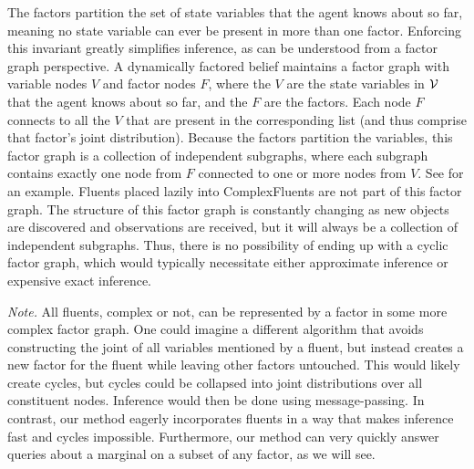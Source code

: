 The factors partition the set of state variables that the agent knows
about so far, meaning no state variable can ever be present in more
than one factor. Enforcing this invariant greatly simplifies
inference, as can be understood from a factor graph perspective. A
dynamically factored belief maintains a factor graph with variable
nodes $V$ and factor nodes $F$, where the $V$ are the state variables
in $\mathcal{V}$ that the agent knows about so far, and the $F$ are the
factors. Each node $F$ connects to all the $V$ that are present in the
corresponding list (and thus comprise that factor's joint
distribution). Because the factors partition the variables, this
factor graph is a collection of independent subgraphs, where each
subgraph contains exactly one node from $F$ connected to one or more
nodes from $V$. See  for an example. Fluents
placed lazily into ComplexFluents are not part of this factor
graph. The structure of this factor graph is constantly changing as
new objects are discovered and observations are received, but it will
always be a collection of independent subgraphs. Thus, there is no
possibility of ending up with a cyclic factor graph, which would
typically necessitate either approximate inference or expensive
exact inference.

\emph{Note.} All fluents, complex or not, can be represented by a
factor in some more complex factor graph. One could imagine a
different algorithm that avoids constructing the joint of all
variables mentioned by a fluent, but instead creates a new factor for the
fluent while leaving other factors untouched. This would likely create
cycles, but cycles could be collapsed into joint distributions over
all constituent nodes. Inference would then be done using
message-passing. In contrast, our method eagerly incorporates fluents
in a way that makes inference fast and cycles impossible. Furthermore,
our method can very quickly answer queries about a marginal on a
subset of any factor, as we will see.

